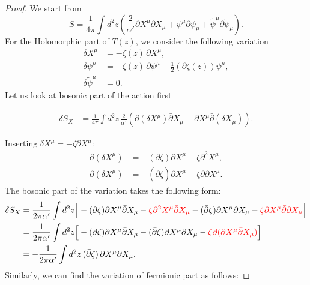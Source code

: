 \begin{tcolorbox}[breakable]
	\begin{proof}
			We start from
		\begin{equation}
			S=\frac{1}{4\pi}\int d^2z\left(\frac{2}{\alpha'}\partial X^\mu \bar\partial X_\mu+\psi^\mu\bar\partial\psi_\mu+\tilde\psi^\mu\partial\tilde\psi_\mu\right).
		\end{equation}
		For the Holomorphic part of $T(z)$, we consider the following variation
		\begin{align}
			\delta X^\mu &= -\zeta(z)\,\partial X^\mu, \\
			\delta \psi^\mu &= -\zeta(z)\,\partial \psi^\mu - \frac{1}{2}(\partial \zeta(z))\psi^\mu, \\
			\delta \tilde{\psi}^\mu &= 0.
		\end{align}
		Let us look at bosonic part of the action first
		
		\begin{align}
			\delta S_X &= \frac{1}{4\pi} \int d^2z\,\frac{2}{\alpha'} 
			\left(\partial(\delta X^\mu)\bar\partial X_\mu + \partial X^\mu \bar\partial(\delta X_\mu)\right).
		\end{align}
		
		Inserting $\delta X^\mu = -\zeta \partial X^\mu$:
		\begin{align}
			\partial(\delta X^\mu) &= -(\partial \zeta)\partial X^\mu - \zeta \partial^2 X^\mu, \\
			\bar\partial(\delta X^\mu) &= -(\bar\partial \zeta)\partial X^\mu - \zeta \bar\partial \partial X^\mu.
		\end{align}
		The bosonic part of the variation takes the following form:
		\begin{align}
			\delta S_X &= \frac{1}{2\pi \alpha'} \int d^2z \Big[
			-(\partial \zeta)\partial X^\mu \bar\partial X_\mu
			- \mathcolor{red}{\zeta \partial^2 X^\mu \bar\partial X_\mu}  - (\bar\partial \zeta)\partial X^\mu \partial X_\mu
			- \mathcolor{red}{\zeta \partial X^\mu \bar\partial \partial X_\mu}
			\Big]\notag\\
		&= \frac{1}{2\pi \alpha'} \int d^2z \Big[
			-(\partial \zeta)\partial X^\mu \bar\partial X_\mu
			  - (\bar\partial \zeta)\partial X^\mu \partial X_\mu
			-\mathcolor{red}{\zeta \partial(\partial X^\mu \bar\partial X_\mu)}
			\Big]\notag\\
			&= -\frac{1}{2\pi \alpha'} \int d^2z\, (\bar\partial \zeta)\, \partial X^\mu \partial X_\mu.
		\end{align}
		Similarly, we can find the variation of fermionic part as follows:
		

\end{proof}
\end{tcolorbox}
